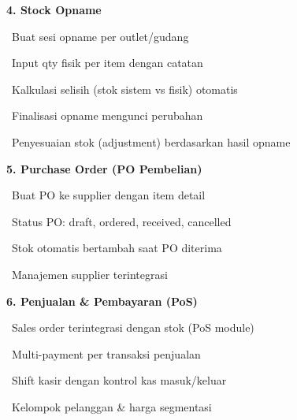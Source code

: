 \documentclass[a4paper]{article}
\begin{document}
\hfill%
\begin{minipage}[t]{0.485\textwidth}

    {\fontsize{10.5}{13}\selectfont\bfseries\color{CyanPrimary} 4. Stock Opname}
    \vspace{3pt}

    {\fontsize{9}{13}\selectfont\color{TextDark}%
    \textbullet\ Buat sesi opname per outlet/gudang\par\vspace{2pt}%
    \textbullet\ Input qty fisik per item dengan catatan\par\vspace{2pt}%
    \textbullet\ Kalkulasi selisih (stok sistem vs fisik) otomatis\par\vspace{2pt}%
    \textbullet\ Finalisasi opname mengunci perubahan\par\vspace{2pt}%
    \textbullet\ Penyesuaian stok (adjustment) berdasarkan hasil opname}%
    \vspace{8pt}

    {\fontsize{10.5}{13}\selectfont\bfseries\color{CyanPrimary} 5. Purchase Order (PO Pembelian)}
    \vspace{3pt}

    {\fontsize{9}{13}\selectfont\color{TextDark}%
    \textbullet\ Buat PO ke supplier dengan item detail\par\vspace{2pt}%
    \textbullet\ Status PO: draft, ordered, received, cancelled\par\vspace{2pt}%
    \textbullet\ Stok otomatis bertambah saat PO diterima\par\vspace{2pt}%
    \textbullet\ Manajemen supplier terintegrasi}%
    \vspace{8pt}

    {\fontsize{10.5}{13}\selectfont\bfseries\color{CyanPrimary} 6. Penjualan \& Pembayaran (PoS)}
    \vspace{3pt}

    {\fontsize{9}{13}\selectfont\color{TextDark}%
    \textbullet\ Sales order terintegrasi dengan stok (PoS module)\par\vspace{2pt}%
    \textbullet\ Multi-payment per transaksi penjualan\par\vspace{2pt}%
    \textbullet\ Shift kasir dengan kontrol kas masuk/keluar\par\vspace{2pt}%
    \textbullet\ Kelompok pelanggan \& harga segmentasi}%

\end{minipage}
\end{document}
